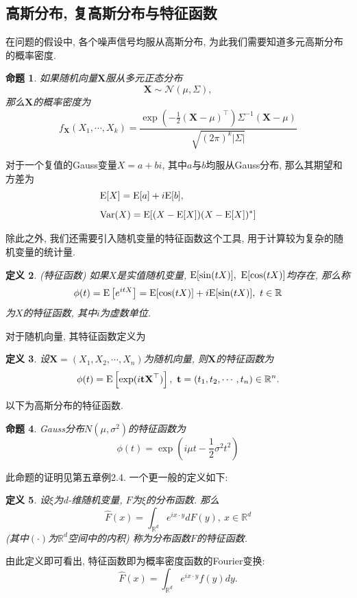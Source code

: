 \documentclass[notitlepage,cs4size,punct,oneside]{ctexrep}
\numberwithin{equation}{section}
\theoremstyle{mystyle}
\newtheorem{definition}{\hspace{2em}定义}[section]
\newtheorem{proposition}[definition]{\hspace{2em}命题}
\begin{document}
\subsection{高斯分布, 复高斯分布与特征函数}
在问题的假设中, 各个噪声信号均服从高斯分布, 为此我们需要知道多元高斯分布的概率密度\cite{shuyuanhe2006probability}.
\begin{proposition} \label{multiVariable gaussian pdf}
如果随机向量$\textbf{X}$服从多元正态分布
$$\textbf{X} \sim \mathcal{N}(\mu, \Sigma),$$
那么$\textbf{X}$的概率密度为
$$f_\textbf{X}(X_1, \cdots, X_k) = \frac{\exp\left(-\frac{1}{2}(\textbf{X}-\mu)^\top\right)\Sigma^{-1}(\textbf{X}-\mu)}{\sqrt{(2\pi)^k|\Sigma|}}$$
\end{proposition}
对于一个复值的Gauss变量$X = a+bi$, 其中$a$与$b$均服从Gauss分布, 那么其期望和方差为
\[
\begin{split}
&\text{E}[X] = \text{E}[a] + i\text{E}[b], \\[5pt]
&\text{Var}(X) = \text{E}[(X-\text{E}[X])(X-\text{E}[X])^*]
\end{split}
\]

除此之外, 我们还需要引入随机变量的特征函数这个工具, 用于计算较为复杂的随机变量的统计量.
\begin{definition}(特征函数) 如果$X$是实值随机变量, $\text{E}[\sin(tX)], ~\text{E}[\cos(tX)]$均存在, 那么称
$$\phi(t) = \text{E}\left[e^{itX}\right] = \text{E}[\cos(tX)] + i\text{E}[\sin(tX)], ~t\in \mathbb{R}$$
为$X$的特征函数, 其中$i$为虚数单位.
\end{definition}
对于随机向量, 其特征函数定义为
\begin{definition} 设$\textbf{X} = (X_1, X_2, \cdots, X_n)$为随机向量, 则$\textbf{X}$的特征函数为
$$\phi(t) = \text{E}\left[\exp(i\textbf{t}\textbf{X}^\top)\right], ~\textbf{t} = (t_1, t_2, \cdots, t_n)\in \mathbb{R}^n.$$
\end{definition}
以下为高斯分布的特征函数.
\begin{proposition} \label{Characteristic function of Gaussian Distribution}
Gauss分布$N(\mu, \sigma^2)$的特征函数为
$$\phi(t) = \exp(i\mu t - \frac{1}{2}\sigma^2t^2)$$
\end{proposition}
此命题的证明见\cite{shuyuanhe2006probability}第五章例2.4.
一个更一般的定义如下\cite{jiangangying2013probability}:
\begin{definition} \label{characteristic function definition 2} 设$\xi$为d-维随机变量, $F$为$\xi$的分布函数. 那么
$$\hat{F}(x) = \int_{\mathbb{R}^d} e^{ix\cdot y}dF(y), ~x\in \mathbb{R}^d$$
(其中$(\cdot)$为$\mathbb{R}^d$空间中的内积) 称为分布函数$F$的特征函数.
\end{definition}
由此定义即可看出, 特征函数即为概率密度函数的Fourier变换:
\begin{equation} \label{characteristic function definition 3}
\hat{F}(x) = \int_{\mathbb{R}^d}e^{ix\cdot y}f(y)dy.
\end{equation}
\end{document}
